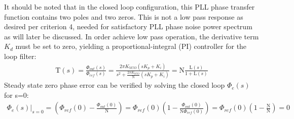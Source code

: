 	It should be noted that in the closed loop configuration, this PLL phase transfer function contains two poles and two zeros. This is not a low pass response as desired per criterion 4, needed for satisfactory PLL phase noise power spectrum as will later be discussed. In order achieve low pass operation, the derivative term $K_d$ must be set to zero, yielding a proportional-integral (PI) controller for the loop filter:
	\begin{align} \label{eq:full_pi_pll_tf}
		\mathrm{T}(s) = \frac{\Phi_{out}(s)}{\Phi_{ref}(s)} = \frac{2\pi K_{VCO}\left(sK_p + K_i\right)}{s^2 + \frac{2\pi K_{VCO}}{\mathrm{N}}\left(sK_p + K_i\right)} = \mathrm{N}\frac{\mathrm{L}(s)}{1 + \mathrm{L}(s)} 
	\end{align}
	Steady state zero phase error can be verified by solving the closed loop $\Phi_e(s)$ for s=0:
	\begin{align}
		\left.\Phi_e(s)\right\vert_{s=0} = \left(\Phi_{ref}(0) - \frac{\Phi_{out}(0)}{\mathrm{N}}\right) = \Phi_{ref}(0)\left(1 - \frac{\Phi_{out}(0)}{\mathrm{N}\Phi_{ref}(0)}\right)= \Phi_{ref}(0)\left(1 - \frac{\mathrm{N}}{\mathrm{N}}\right) = 0
	\end{align}

